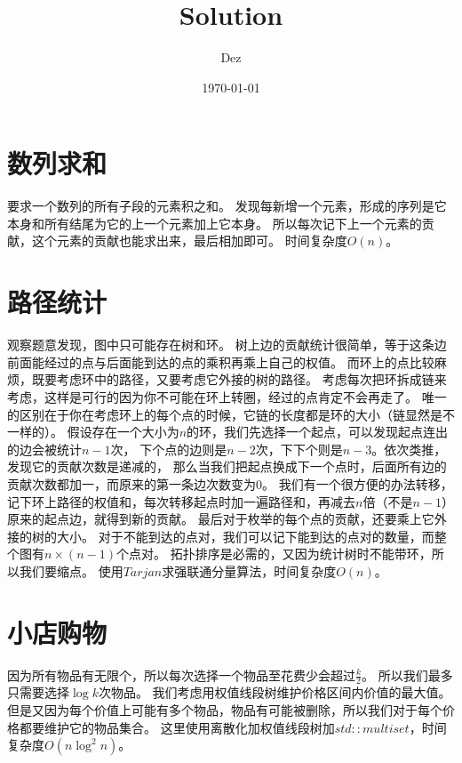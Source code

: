 \documentclass{article}
\title{Solution}
\author{Dez}
\date{\today}
\begin{document}
\maketitle

\section{数列求和}
要求一个数列的所有子段的元素积之和。
发现每新增一个元素，形成的序列是它本身和所有结尾为它的上一个元素加上它本身。
所以每次记下上一个元素的贡献，这个元素的贡献也能求出来，最后相加即可。
时间复杂度$O(n)$。

\section{路径统计}
观察题意发现，图中只可能存在树和环。
树上边的贡献统计很简单，等于这条边前面能经过的点与后面能到达的点的乘积再乘上自己的权值。
而环上的点比较麻烦，既要考虑环中的路径，又要考虑它外接的树的路径。
考虑每次把环拆成链来考虑，这样是可行的因为你不可能在环上转圈，经过的点肯定不会再走了。
唯一的区别在于你在考虑环上的每个点的时候，它链的长度都是环的大小（链显然是不一样的）。
假设存在一个大小为$n$的环，我们先选择一个起点，可以发现起点连出的边会被统计$n-1$次，
下个点的边则是$n-2$次，下下个则是$n-3$。依次类推，发现它的贡献次数是递减的，
那么当我们把起点换成下一个点时，后面所有边的贡献次数都加一，而原来的第一条边次数变为$0$。
我们有一个很方便的办法转移，记下环上路径的权值和，每次转移起点时加一遍路径和，再减去$n$倍（不是$n-1$）原来的起点边，就得到新的贡献。
最后对于枚举的每个点的贡献，还要乘上它外接的树的大小。
对于不能到达的点对，我们可以记下能到达的点对的数量，而整个图有$n\times (n-1)$个点对。
拓扑排序是必需的，又因为统计树时不能带环，所以我们要缩点。
使用$Tarjan$求强联通分量算法，时间复杂度$O(n)$。

\section{小店购物}
因为所有物品有无限个，所以每次选择一个物品至花费少会超过$\frac{k}{2}$。
所以我们最多只需要选择$\log k$次物品。
我们考虑用权值线段树维护价格区间内价值的最大值。
但是又因为每个价值上可能有多个物品，物品有可能被删除，所以我们对于每个价格都要维护它的物品集合。
这里使用离散化加权值线段树加$std::multiset$，时间复杂度$O(n\log^2n)$。
\end{document}

